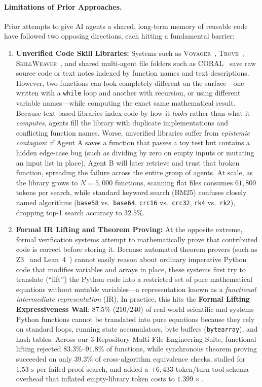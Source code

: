 \documentclass[10pt,twocolumn]{article}
\begin{document}
\paragraph{Limitations of Prior Approaches.}
Prior attempts to give AI agents a shared, long-term memory of reusable code have followed two opposing directions, each hitting a fundamental barrier:
\begin{enumerate}
    \item \textbf{Unverified Code Skill Libraries:} Systems such as \textsc{Voyager}~\cite{wang2023voyager}, \textsc{Trove}~\cite{wang2024trove}, \textsc{SkillWeaver}~\cite{skillweaver2025}, and shared multi-agent file folders such as \textsc{CORAL}~\cite{coral2026} save raw source code or text notes indexed by function names and text descriptions. However, two functions can look completely different on the surface---one written with a \texttt{while} loop and another with recursion, or using different variable names---while computing the exact same mathematical result. Because text-based libraries index code by how it \emph{looks} rather than what it \emph{computes}, agents fill the library with duplicate implementations and conflicting function names. Worse, unverified libraries suffer from \emph{epistemic contagion}: if Agent A saves a function that passes a toy test but contains a hidden edge-case bug (such as dividing by zero on empty inputs or mutating an input list in place), Agent B will later retrieve and trust that broken function, spreading the failure across the entire group of agents. At scale, as the library grows to $N=5{,}000$ functions, scanning flat files consumes $61{,}800$ tokens per search, while standard keyword search (BM25) confuses closely named algorithms (\texttt{base58} vs.\ \texttt{base64}, \texttt{crc16} vs.\ \texttt{crc32}, \texttt{rk4} vs.\ \texttt{rk2}), dropping top-1 search accuracy to $32.5\%$.
    \item \textbf{Formal IR Lifting and Theorem Proving:} At the opposite extreme, formal verification systems attempt to mathematically prove that contributed code is correct before storing it. Because automated theorem provers (such as Z3~\cite{demoura2008z3} and Lean~4~\cite{moura2021lean4}) cannot easily reason about ordinary imperative Python code that modifies variables and arrays in place, these systems first try to translate (``lift'') the Python code into a restricted set of pure mathematical equations without mutable variables---a representation known as a \emph{functional intermediate representation} (IR). In practice, this hits the \textbf{Formal Lifting Expressiveness Wall}: $87.5\%$ ($210/240$) of real-world scientific and systems Python functions cannot be translated into pure equations because they rely on standard loops, running state accumulators, byte buffers (\texttt{bytearray}), and hash tables. Across our 3-Repository Multi-File Engineering Suite, functional lifting rejected $83.3\%\text{--}91.8\%$ of functions, while synchronous theorem proving succeeded on only $39.3\%$ of cross-algorithm equivalence checks, stalled for $1.53\text{ s}$ per failed proof search, and added a $+6{,}433$-token/turn tool-schema overhead that inflated empty-library token costs to $1.399\times$.
\end{enumerate}
\end{document}
